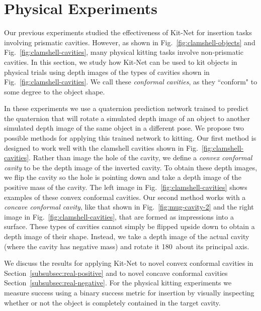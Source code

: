 \section{Physical Experiments}
\label{sec:physical-experiments}
Our previous experiments studied the effectiveness of Kit-Net for insertion tasks involving prismatic cavities. However, as shown in Fig.~\ref{fig:clamshell-objects} and Fig.~\ref{fig:clamshell-cavities}, many physical kitting tasks involve non-prismatic cavities. In this section, we study how Kit-Net can be used to kit objects in physical trials using depth images of the types of cavities shown in Fig.~\ref{fig:clamshell-cavities}. We call these \emph{conformal cavities}, as they ``conform" to some degree to the object shape. 

In these experiments we use a quaternion prediction network trained to predict the quaternion that will rotate a simulated depth image of an object to another simulated depth image of the same object in a different pose. We propose two possible methods for applying this trained network to kitting. Our first method is designed to work well with the clamshell cavities shown in Fig.~\ref{fig:clamshell-cavities}. Rather than image the hole of the cavity, we define a \emph{convex conformal cavity} to be the depth image of the inverted cavity. To obtain these depth images, we flip the cavity so the hole is pointing down and take a depth image of the positive mass of the cavity. The left image in Fig.~\ref{fig:clamshell-cavities} shows examples of these convex conformal cavities. Our second method works with a \emph{concave conformal cavity}, like that shown in Fig.~\ref{fig:mug-cavity-2} and the right image in Fig.~\ref{fig:clamshell-cavities}, that are formed as impressions into a surface. These types of cavities cannot simply be flipped upside down to obtain a depth image of their shape. Instead, we take a depth image of the actual cavity (where the cavity has negative mass) and rotate it 180\degree~about its principal axis.

We discuss the results for applying Kit-Net to novel convex conformal cavities in Section~\ref{subsubsec:real-positive} and to novel concave conformal cavities Section~\ref{subsubsec:real-negative}.
For the physical kitting experiments we measure success using a binary success metric for insertion by visually inspecting whether or not the object is completely contained in the target cavity.



